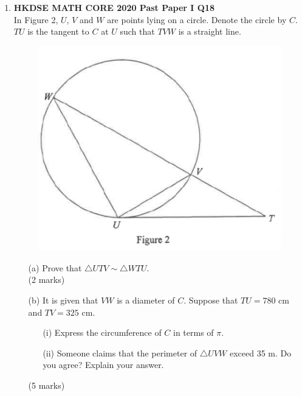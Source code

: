 \documentclass[12pt]{article}
\begin{document}
\begin{enumerate}
	\item \textbf{HKDSE MATH CORE 2020 Past Paper I Q18}\\
	In Figure 2, $U$, $V$ and $W$ are points lying on a circle. Denote the circle by $C$. $TU$ is the tangent to $C$ at $U$ such that $TVW$ is a straight line.
	\begin{figure}[H]
		\centering
		\includegraphics[width = .3\linewidth]{2020Figure1.2}
	\end{figure}
	\begin{enumerate}
		\item[(a)] Prove that $\triangle UTV \sim \triangle WTU$. \\(2 marks)
		\item[(b)] It is given that $VW$ is a diameter of $C$. Suppose that $TU = 780$ cm and $TV = 325$ cm.
		\begin{enumerate}
			\item[(i)] Express the circumference of $C$ in terms of $\pi$.
			\item[(ii)] Someone claims that the perimeter of $\triangle UVW$ exceed 35 m. Do you agree? Explain your answer.
		\end{enumerate}
		(5 marks)
	\end{enumerate}


\end{enumerate}
\end{document}
